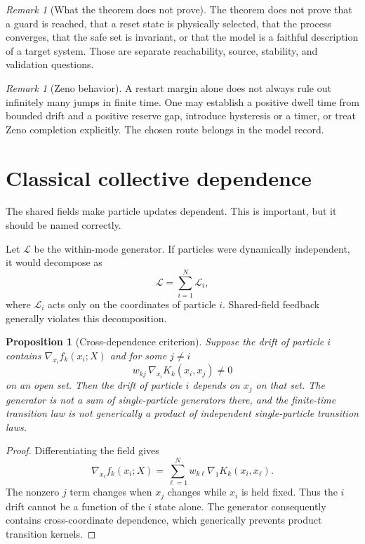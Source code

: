 \documentclass[11pt]{article}
\newtheorem{proposition}[theorem]{Proposition}
\theoremstyle{definition}
\theoremstyle{remark}
\newtheorem{remark}[theorem]{Remark}
\newcommand{\cL}{\mathcal L}
\newcommand{\grad}{\nabla}
\begin{document}
\begin{remark}[What the theorem does not prove]
The theorem does not prove that a guard is reached, that a reset state is
physically selected, that the process converges, that the safe set is
invariant, or that the model is a faithful description of a target system.
Those are separate reachability, source, stability, and validation
questions.
\end{remark}

\begin{remark}[Zeno behavior]
A restart margin alone does not always rule out infinitely many jumps in
finite time.  One may establish a positive dwell time from bounded drift
and a positive reserve gap, introduce hysteresis or a timer, or treat Zeno
completion explicitly.  The chosen route belongs in the model record.
\end{remark}

\section{Classical collective dependence}
\label{sec:coupling}

The shared fields make particle updates dependent.  This is important, but
it should be named correctly.

Let $\cL$ be the within-mode generator.  If particles were dynamically
independent, it would decompose as
\[
 \cL=\sum_{i=1}^{N}\cL_i,
\]
where $\cL_i$ acts only on the coordinates of particle $i$.  Shared-field
feedback generally violates this decomposition.

\begin{proposition}[Cross-dependence criterion]
\label{prop:cross-dependence}
Suppose the drift of particle $i$ contains
$\grad_{x_i}f_k(x_i;X)$ and for some $j\ne i$
\[
 w_{kj}\,\grad_{x_i}K_k(x_i,x_j)\ne0
\]
on an open set.  Then the drift of particle $i$ depends on $x_j$ on that
set.  The generator is not a sum of single-particle generators there, and
the finite-time transition law is not generically a product of independent
single-particle transition laws.
\end{proposition}

\begin{proof}
Differentiating the field gives
\[
 \grad_{x_i}f_k(x_i;X)
 =
 \sum_{\ell=1}^{N}
 w_{k\ell}\grad_1K_k(x_i,x_\ell).
\]
The nonzero $j$ term changes when $x_j$ changes while $x_i$ is held fixed.
Thus the $i$ drift cannot be a function of the $i$ state alone.  The
generator consequently contains cross-coordinate dependence, which
generically prevents product transition kernels.
\end{proof}
\end{document}
